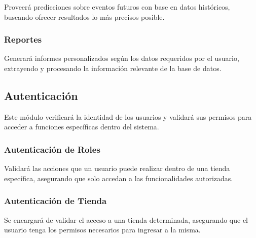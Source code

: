Proveerá predicciones sobre eventos futuros con base en datos históricos, buscando ofrecer resultados lo más precisos posible.

\subsubsection{Reportes}

Generará informes personalizados según los datos requeridos por el usuario, extrayendo y procesando la información relevante de la base de datos.

\subsection{Autenticación}

Este módulo verificará la identidad de los usuarios y validará sus permisos para acceder a funciones específicas dentro del sistema.

\subsubsection{Autenticación de Roles}

Validará las acciones que un usuario puede realizar dentro de una tienda específica, asegurando que solo accedan a las funcionalidades autorizadas.

\subsubsection{Autenticación de Tienda}

Se encargará de validar el acceso a una tienda determinada, asegurando que el usuario tenga los permisos necesarios para ingresar a la misma.
